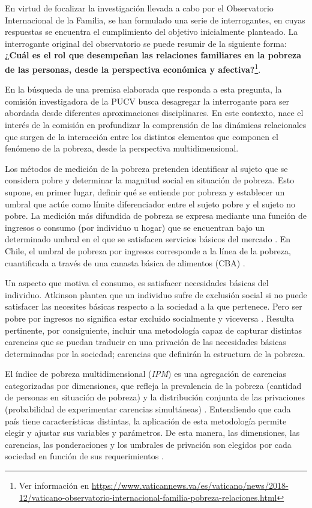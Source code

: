 \documentclass[12pt,letterpaper,spanish]{article}
\begin{document}
En virtud de focalizar la investigación llevada a cabo por el Observatorio Internacional de la Familia, se han formulado una serie de interrogantes, en cuyas respuestas se encuentra el cumplimiento del objetivo inicialmente planteado. La interrogante original del observatorio se puede resumir de la siguiente forma: \textbf{¿Cuál es el rol que desempeñan las relaciones familiares en la pobreza de las personas, desde la perspectiva económica y afectiva?}\footnote{Ver información en \url{https://www.vaticannews.va/es/vaticano/news/2018-12/vaticano-observatorio-internacional-familia-pobreza-relaciones.html}}. 

En la búsqueda de una premisa elaborada que responda a esta pregunta, la comisión investigadora de la PUCV busca desagregar la interrogante para ser abordada desde diferentes aproximaciones disciplinares. En este contexto, nace el interés de la comisión en profundizar la comprensión de las dinámicas relacionales que surgen de la interacción entre los distintos elementos que componen el fenómeno de la pobreza, desde la perspectiva multidimensional. 

Los métodos de medición de la pobreza pretenden identificar al sujeto que se considera pobre y determinar la magnitud social en situación de pobreza. Esto supone, en primer lugar, definir qué se entiende por pobreza y establecer un umbral que actúe como límite diferenciador entre el sujeto pobre y el sujeto no pobre. La medición más difundida de pobreza se expresa mediante una función de ingresos o consumo (por individuo u hogar) que se encuentran bajo un determinado umbral en el que se satisfacen servicios básicos del mercado \cite{Ravallion2011OnPoverty}. En Chile, el umbral de pobreza por ingresos corresponde a la línea de la pobreza, cuantificada a través de una canasta básica de alimentos (CBA) \cite{CEPAL2018MedicionResultados}.

Un aspecto que motiva el consumo, es satisfacer necesidades básicas del individuo. Atkinson plantea que un individuo sufre de exclusión social si no puede satisfacer las necesites básicas respecto a la sociedad a la que pertenece. Pero ser pobre por ingresos no significa estar excluido socialmente y viceversa \cite{AtkinsonExclusionNote}. Resulta pertinente, por consiguiente, incluir una metodología capaz de capturar distintas carencias que se puedan traducir en una privación de las necesidades básicas determinadas por la sociedad; carencias que definirán la estructura de la pobreza.

El índice de pobreza multidimensional (\textit{IPM}) es una agregación de carencias categorizadas por dimensiones, que refleja la prevalencia de la pobreza (cantidad de personas en situación de pobreza) y la distribución conjunta de las privaciones (probabilidad de experimentar carencias simultáneas) \cite{Alkire2007CountingMeasurement}. Entendiendo que cada país tiene características distintas, la aplicación de esta metodología permite elegir y ajustar sus variables y parámetros. De esta manera, las dimensiones, las carencias, las ponderaciones y los umbrales de privación son elegidos por cada sociedad en función de sus requerimientos \cite{Alkire2011UnderstandingsMeasurement}.
\end{document}
